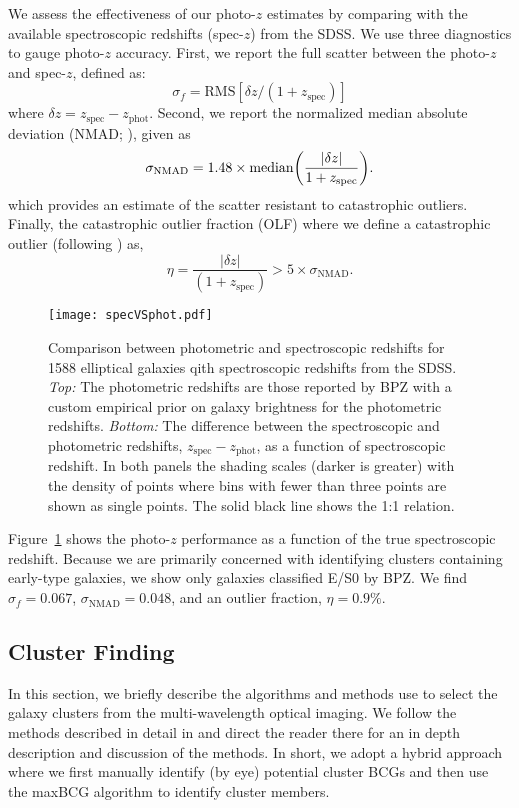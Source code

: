 \documentclass[apj, revtex4-1]{emulateapj}
\begin{document}
We assess the effectiveness of our photo-$z$ estimates by comparing with the available spectroscopic redshifts (spec-$z$) from the SDSS. We use three diagnostics to gauge photo-$z$ accuracy. First, we report the full scatter between the photo-$z$ and spec-$z$, defined as:
\begin{equation}\label{eqn:scatter}
	\sigma_f = \mathrm{RMS}[\delta z/(1+z_\mathrm{spec})]
\end{equation}
where $\delta z = z_\mathrm{spec} - z_\mathrm{phot}$. Second, we report the normalized median absolute deviation (NMAD; \citealt{Ilbert2009, Dahlen2013, Molino2017}), given as
\begin{equation}\label{eqn:nmad}
	\sigma_\mathrm{NMAD} = 1.48 \times \mathrm{median} \bigg{(} \frac{|\delta z|}{1+z_\mathrm{spec}} \bigg{)}.
\end{equation}
which provides an estimate of the scatter resistant to catastrophic outliers. Finally, the catastrophic outlier fraction (OLF) where we define a catastrophic outlier (following \citealt{Molino2017}) as,
\begin{equation}\label{eqn:OLF}
	\eta = \frac{|\delta z|}{(1+z_\mathrm{spec})} > 5 \times \sigma_\mathrm{NMAD}.
\end{equation}

\begin{figure}
	\texttt{[image: specVSphot.pdf]}
	\caption{Comparison between photometric and spectroscopic redshifts for 1588 elliptical galaxies qith spectroscopic redshifts from the SDSS. \textit{Top:} The photometric redshifts are those reported by BPZ with a custom empirical prior on galaxy brightness for the photometric redshifts. \textit{Bottom:} The difference between the spectroscopic and photometric redshifts, $z_\mathrm{spec} - z_\mathrm{phot}$, as a function of spectroscopic redshift. In both panels the shading scales (darker is greater) with the density of points where bins with fewer than three points are shown as single points. The solid black line shows the 1:1 relation.}
	\label{fig:photozspecz}
\end{figure}

Figure~\ref{fig:photozspecz} shows the photo-$z$ performance as a function of the true spectroscopic redshift. Because we are primarily concerned with identifying clusters containing early-type galaxies, we show only galaxies classified E/S0 by BPZ. We find $\sigma_f = 0.067$, $\sigma_\mathrm{NMAD} = 0.048$, and an outlier fraction, $\eta = 0.9\%$.

\subsection{Cluster Finding}
In this section, we briefly describe the algorithms and methods use to select the galaxy clusters from the multi-wavelength optical imaging. We follow the methods described in detail in \cite{Menanteau2009a, Menanteau2010} and direct the reader there for an in depth description and discussion of the methods. In short, we adopt a hybrid approach where we first manually identify (by eye) potential cluster BCGs and then use the maxBCG algorithm \citep{Koester2007} to identify cluster members.
\end{document}
